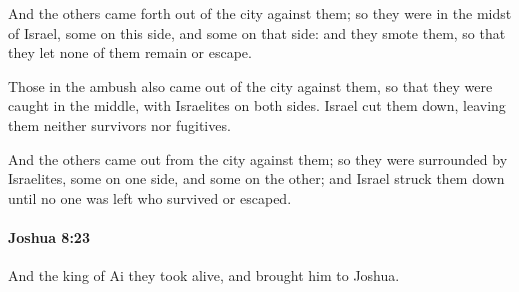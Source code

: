 			\begin{versebox}
					\item[BHS] 
					\item[ASV] And the others came forth out of the city against them; so they were in the midst of Israel, some on this side, and some on that side: and they smote them, so that they let none of them remain or escape.
					\item[NIV] Those in the ambush also came out of the city against them, so that they were caught in the middle, with Israelites on both sides. Israel cut them down, leaving them neither survivors nor fugitives.
					\item[NRSV] And the others came out from the city against them; so they were surrounded by Israelites, some on one side, and some on the other; and Israel struck them down until no one was left who survived or escaped.
			\end{versebox}

		\paragraph{Joshua 8:23} %
			\label{JOSHUA-8-23}

			And the king of Ai they took alive, and brought him to Joshua.

